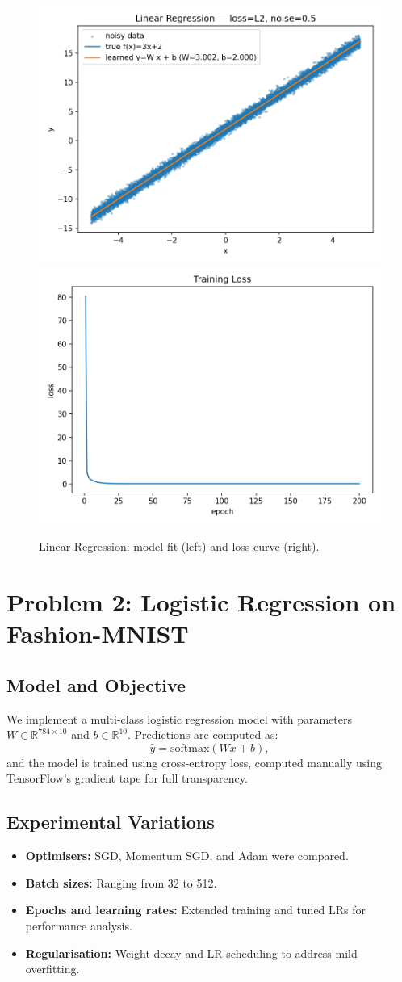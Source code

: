 \documentclass{article}
\begin{document}
\begin{figure}[t]
\centering
\includegraphics[width=.48\linewidth]{figs/linreg_l2_lr0.05_noise0.5_seed808_fit.png}\hfill
\includegraphics[width=.48\linewidth]{figs/linreg_l2_lr0.05_noise0.5_seed808_loss.png}
\caption{Linear Regression: model fit (left) and loss curve (right).}
\label{fig:lin}
\end{figure}

\section{Problem 2: Logistic Regression on Fashion-MNIST}
\subsection{Model and Objective}
We implement a multi-class logistic regression model with parameters $W \in \mathbb{R}^{784\times10}$ and $b \in \mathbb{R}^{10}$. Predictions are computed as:
\[
\hat{y} = \text{softmax}(Wx + b),
\]
and the model is trained using cross-entropy loss, computed manually using TensorFlow’s gradient tape for full transparency.

\subsection{Experimental Variations}
\begin{itemize}
    \item \textbf{Optimisers:} SGD, Momentum SGD, and Adam were compared.
    \item \textbf{Batch sizes:} Ranging from 32 to 512.
    \item \textbf{Epochs and learning rates:} Extended training and tuned LRs for performance analysis.
    \item \textbf{Regularisation:} Weight decay and LR scheduling to address mild overfitting.
\end{itemize}
\end{document}
